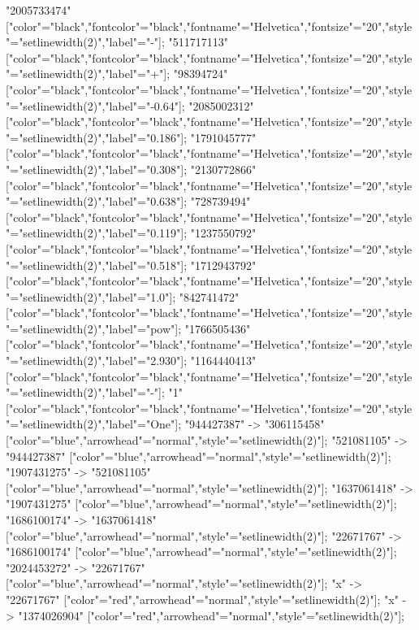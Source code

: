 {    "2005733474" ["color"="black","fontcolor"="black","fontname"="Helvetica","fontsize"="20","style"="setlinewidth(2)","label"="-"];
    "511717113" ["color"="black","fontcolor"="black","fontname"="Helvetica","fontsize"="20","style"="setlinewidth(2)","label"="+"];
    "98394724" ["color"="black","fontcolor"="black","fontname"="Helvetica","fontsize"="20","style"="setlinewidth(2)","label"="-0.64"];
    "2085002312" ["color"="black","fontcolor"="black","fontname"="Helvetica","fontsize"="20","style"="setlinewidth(2)","label"="0.186"];
    "1791045777" ["color"="black","fontcolor"="black","fontname"="Helvetica","fontsize"="20","style"="setlinewidth(2)","label"="0.308"];
    "2130772866" ["color"="black","fontcolor"="black","fontname"="Helvetica","fontsize"="20","style"="setlinewidth(2)","label"="0.638"];
    "728739494" ["color"="black","fontcolor"="black","fontname"="Helvetica","fontsize"="20","style"="setlinewidth(2)","label"="0.119"];
    "1237550792" ["color"="black","fontcolor"="black","fontname"="Helvetica","fontsize"="20","style"="setlinewidth(2)","label"="0.518"];
    "1712943792" ["color"="black","fontcolor"="black","fontname"="Helvetica","fontsize"="20","style"="setlinewidth(2)","label"="1.0"];
    "842741472" ["color"="black","fontcolor"="black","fontname"="Helvetica","fontsize"="20","style"="setlinewidth(2)","label"="pow"];
    "1766505436" ["color"="black","fontcolor"="black","fontname"="Helvetica","fontsize"="20","style"="setlinewidth(2)","label"="2.930"];
    "1164440413" ["color"="black","fontcolor"="black","fontname"="Helvetica","fontsize"="20","style"="setlinewidth(2)","label"="-"];
    "1" ["color"="black","fontcolor"="black","fontname"="Helvetica","fontsize"="20","style"="setlinewidth(2)","label"="One"];
    "944427387" -> "306115458" ["color"="blue","arrowhead"="normal","style"="setlinewidth(2)"];
    "521081105" -> "944427387" ["color"="blue","arrowhead"="normal","style"="setlinewidth(2)"];
    "1907431275" -> "521081105" ["color"="blue","arrowhead"="normal","style"="setlinewidth(2)"];
    "1637061418" -> "1907431275" ["color"="blue","arrowhead"="normal","style"="setlinewidth(2)"];
    "1686100174" -> "1637061418" ["color"="blue","arrowhead"="normal","style"="setlinewidth(2)"];
    "22671767" -> "1686100174" ["color"="blue","arrowhead"="normal","style"="setlinewidth(2)"];
    "2024453272" -> "22671767" ["color"="blue","arrowhead"="normal","style"="setlinewidth(2)"];
    "x" -> "22671767" ["color"="red","arrowhead"="normal","style"="setlinewidth(2)"];
    "x" -> "1374026904" ["color"="red","arrowhead"="normal","style"="setlinewidth(2)"];
}
